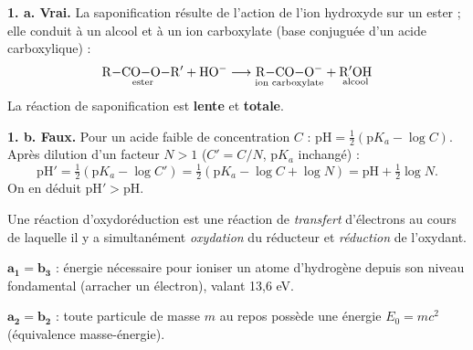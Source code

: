 \documentclass[11pt]{article}
\begin{document}


\textbf{1. a. Vrai.} La saponification résulte de l'action de l'ion hydroxyde  sur un ester ; elle conduit à un alcool et à un ion carboxylate (base conjuguée d'un acide carboxylique) :
\[ \underset{\text{ester}}{\mathrm{R{-}CO{-}O{-}R'}} + \mathrm{HO^-} \longrightarrow \underset{\text{ion carboxylate}}{\mathrm{R{-}CO{-}O^-}} + \underset{\text{alcool}}{\mathrm{R'OH}} \]
La réaction de saponification est \textbf{lente} et \textbf{totale}.

\textbf{1. b. Faux.} Pour un acide faible de concentration $C$ : $\text{pH} = \frac{1}{2}(\text{p}K_a - \log C)$. Après dilution d'un facteur $N > 1$ ($C' = C/N$, $\text{p}K_a$ inchangé) :
\[ \text{pH}' = \tfrac{1}{2}(\text{p}K_a - \log C') = \tfrac{1}{2}(\text{p}K_a - \log C + \log N) = \text{pH} + \tfrac{1}{2}\log N. \]
On en déduit $\text{pH}' > \text{pH}$.

Une réaction d'oxydoréduction est une réaction de \emph{transfert} d'électrons au cours de laquelle il y a simultanément \emph{oxydation} du réducteur et \emph{réduction} de l'oxydant.

$\mathbf{a_1 = b_3}$ : énergie nécessaire pour ioniser un atome d'hydrogène depuis son niveau fondamental (arracher un électron), valant 13,6 eV.

$\mathbf{a_2 = b_2}$ : toute particule de masse $m$ au repos possède une énergie $E_0 = mc^2$ (équivalence masse-énergie).
\end{document}
